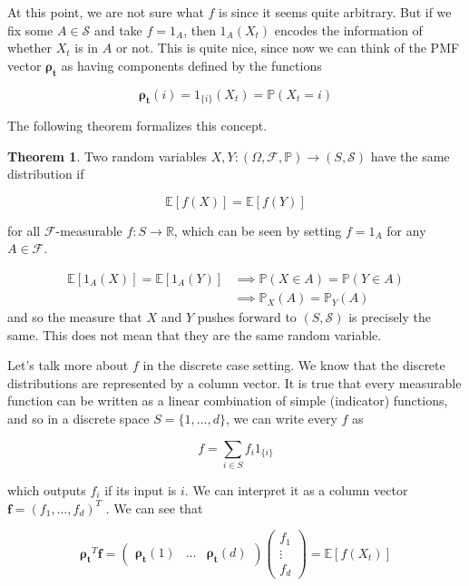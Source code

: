 \documentclass{article}
\theoremstyle{definition}
\newtheorem{theorem}{Theorem}[section]
\theoremstyle{remark}
\theoremstyle{definition}
\begin{document}
    At this point, we are not sure what $f$ is since it seems quite arbitrary. But if we fix some $A \in \mathcal{S}$ and take $f = 1_A$, then $1_A (X_t)$ encodes the information of whether $X_t$ is in $A$ or not. This is quite nice, since now we can think of the PMF vector $\boldsymbol{\rho_t}$ as having components defined by the functions 

      \[\boldsymbol{\rho_t} (i) = 1_{\{i\}} (X_t) = \mathbb{P}(X_t = i)\]

    The following theorem formalizes this concept. 

    \begin{theorem}
      Two random variables $X, Y : (\Omega, \mathcal{F}, \mathbb{P}) \rightarrow (S, \mathcal{S})$ have the same distribution if 

        \[\mathbb{E}[f(X)] = \mathbb{E}[f(Y)]\]

      for all $\mathcal{F}$-measurable $f: S \rightarrow \mathbb{R}$, which can be seen by setting $f = 1_A$ for any $A \in \mathcal{F}$. 

      \begin{align*}
        \mathbb{E}[1_A (X)] = \mathbb{E}[1_A (Y)] & \implies \mathbb{P}(X \in A) = \mathbb{P}(Y \in A) \\
        & \implies \mathbb{P}_X (A) = \mathbb{P}_Y (A)
      \end{align*}
      and so the measure that $X$ and $Y$ pushes forward to $(S, \mathcal{S})$ is precisely the same. This does not mean that they are the same random variable. 
    \end{theorem}

    Let's talk more about $f$ in the discrete case setting. We know that the discrete distributions are represented by a column vector. It is true that every measurable function can be written as a linear combination of simple (indicator) functions, and so in a discrete space $S = \{1, \ldots, d\}$, we can write every $f$ as 

      \[f = \sum_{i \in S} f_i 1_{\{i\}} \]

    which outputs $f_i$ if its input is $i$. We can interpret it as a column vector $\mathbf{f} = (f_1, \ldots, f_d)^T$ . We can see that 

      \[\boldsymbol{\rho_t}^T \mathbf{f} = \begin{pmatrix} \boldsymbol{\rho_t} (1) & \ldots & \boldsymbol{\rho_t} (d) \end{pmatrix} \begin{pmatrix} f_1 \\ \vdots \\ f_d \end{pmatrix} = \mathbb{E}[f(X_t)]\]
\end{document}
